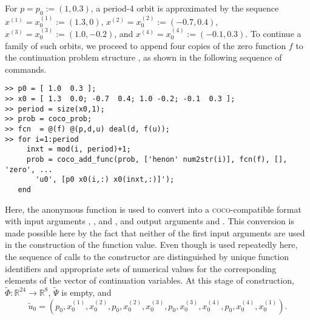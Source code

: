 For $p=p_0:=(1,0.3)$, a period-4 orbit is approximated by the sequence $x^{(1)}=x^{(1)}_0:=(1.3,0)$, $x^{(2)}=x^{(2)}_0:=(-0.7,0.4)$, $x^{(3)}=x^{(3)}_0:=(1.0,-0.2)$, and $x^{(4)}=x^{(4)}_0:=(-0.1,0.3)$. To continue a family of such orbits, we proceed to append four copies of the zero function $f$ to the continuation problem structure , as shown in the following sequence of commands.
\begin{lstlisting}[language=coco-highlight]
>> p0 = [ 1.0  0.3 ];
>> x0 = [ 1.3  0.0; -0.7  0.4; 1.0 -0.2; -0.1  0.3 ];
>> period = size(x0,1);
>> prob = coco_prob;
>> fcn  = @(f) @(p,d,u) deal(d, f(u));
>> for i=1:period
     inxt = mod(i, period)+1;
     prob = coco_add_func(prob, ['henon' num2str(i)], fcn(f), [], 'zero', ...
       'u0', [p0 x0(i,:) x0(inxt,:)]');
   end
\end{lstlisting}
Here, the anonymous function  is used to convert  into a \textsc{coco}-compatible format with input arguments , , and , and output arguments  and . This conversion is made possible here by the fact that neither of the first input arguments are used in the construction of the function value. Even though  is used repeatedly here, the sequence of calls to the  constructor are distinguished by unique function identifiers and appropriate sets of numerical values for the corresponding elements of the vector of continuation variables. At this stage of construction, $\tilde{\Phi}:\mathbb{R}^{24}\rightarrow\mathbb{R}^8$, $\tilde{\Psi}$ is empty, and
\begin{equation}
\tilde{u}_0=(p_0,x^{(1)}_0,x^{(2)}_0,p_0,x^{(2)}_0,x^{(3)}_0,p_0,x^{(3)}_0,x^{(4)}_0,p_0,x^{(4)}_0,x^{(1)}_0).
\end{equation}

